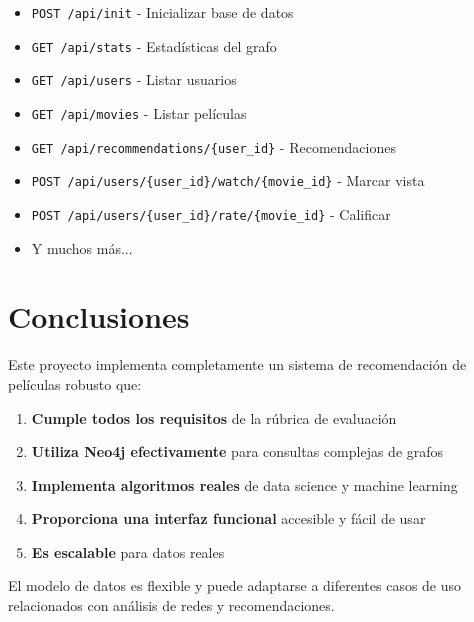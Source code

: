 \documentclass[12pt]{article}
\begin{document}
\begin{itemize}
    \item \texttt{POST /api/init} - Inicializar base de datos
    \item \texttt{GET /api/stats} - Estadísticas del grafo
    \item \texttt{GET /api/users} - Listar usuarios
    \item \texttt{GET /api/movies} - Listar películas
    \item \texttt{GET /api/recommendations/\{user\_id\}} - Recomendaciones
    \item \texttt{POST /api/users/\{user\_id\}/watch/\{movie\_id\}} - Marcar vista
    \item \texttt{POST /api/users/\{user\_id\}/rate/\{movie\_id\}} - Calificar
    \item Y muchos más...
\end{itemize}

\section{Conclusiones}

Este proyecto implementa completamente un sistema de recomendación de películas robusto que:

\begin{enumerate}
    \item \textbf{Cumple todos los requisitos} de la rúbrica de evaluación
    \item \textbf{Utiliza Neo4j efectivamente} para consultas complejas de grafos
    \item \textbf{Implementa algoritmos reales} de data science y machine learning
    \item \textbf{Proporciona una interfaz funcional} accesible y fácil de usar
    \item \textbf{Es escalable} para datos reales
\end{enumerate}

El modelo de datos es flexible y puede adaptarse a diferentes casos de uso relacionados con análisis de redes y recomendaciones.
\end{document}
